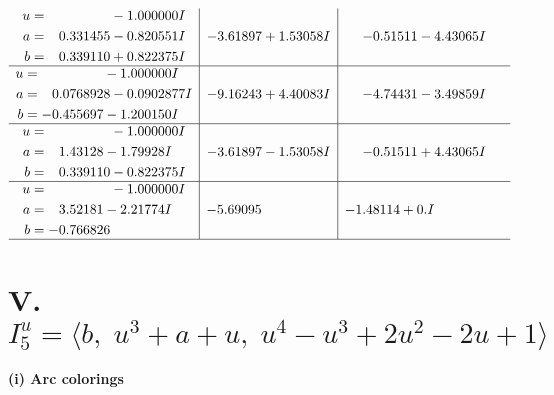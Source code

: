 \documentclass[1p]{elsarticle_modified}
\theoremstyle{definition}
\begin{document}
$$\begin{array}{c|c|c}
\begin{aligned}
u &= \phantom{-0.000000 } -1.000000 I \\
a &= \phantom{-}0.331455 - 0.820551 I \\
b &= \phantom{-}0.339110 + 0.822375 I\end{aligned}
 & -3.61897 + 1.53058 I & -0.51511 - 4.43065 I \\ \hline\begin{aligned}
u &= \phantom{-0.000000 } -1.000000 I \\
a &= \phantom{-}0.0768928 - 0.0902877 I \\
b &= -0.455697 - 1.200150 I\end{aligned}
 & -9.16243 + 4.40083 I & -4.74431 - 3.49859 I \\ \hline\begin{aligned}
u &= \phantom{-0.000000 } -1.000000 I \\
a &= \phantom{-}1.43128 - 1.79928 I \\
b &= \phantom{-}0.339110 - 0.822375 I\end{aligned}
 & -3.61897 - 1.53058 I & -0.51511 + 4.43065 I \\ \hline\begin{aligned}
u &= \phantom{-0.000000 } -1.000000 I \\
a &= \phantom{-}3.52181 - 2.21774 I \\
b &= -0.766826\phantom{ +0.000000I}\end{aligned}
 & -5.69095\phantom{ +0.000000I} & -1.48114 + 0. I\phantom{ +0.000000I}\\
 \hline 
 \end{array}$$\newpage\newpage\renewcommand{\arraystretch}{1}
\centering \section*{V. $I^u_{5}= \langle b,\;u^3+a+u,\;u^4- u^3+2 u^2-2 u+1 \rangle$}
\flushleft \textbf{(i) Arc colorings}\\
\end{document}
